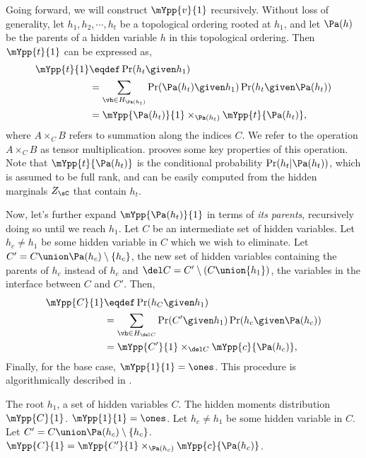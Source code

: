 Going forward, we will construct $\mYpp{v}{1}$ recursively.
Without loss of generality, let $h_1, h_2, \cdots, h_t$ be a topological
  ordering rooted at $h_1$,
and let $\Pa(h)$ be the parents of a hidden variable $h$ in
  this topological ordering.
Then $\mYpp{t}{1}$ can be expressed as,
\begin{align*}
  \mYpp{t}{1} &\eqdef \Pr( h_t \given h_1 )  \\
  &= \sum_{\vh \in H_{\Pa(h_t)}} \Pr( \Pa(h_t) \given h_1 ) \Pr( h_t \given \Pa(h_t) ) \\
  &= \mYpp{ \Pa(h_t) }{1} \times_{\Pa(h_t)} \mYpp{t}{\Pa(h_t)},
\end{align*}
where $A \times_{C} B$ refers to summation along the indices $C$. We
refer to the operation $A \times_C B$ as tensor multiplication.
 prooves some key properties of this
operation. 
Note that $\mYpp{t}{\Pa(h_t)}$ is the conditional probability $\Pr(h_t
 | \Pa(h_t))$, which is assumed to be full rank, and can be easily
 computed from the hidden marginals $Z_\sC$ that contain $h_t$. 

Now, let's further expand $\mYpp{ \Pa(h_t) }{1}$ in terms of {\em its
  parents}, recursively doing so until we reach $h_1$.
Let $C$ be an intermediate set of hidden variables. Let $h_c \neq h_1$
  be some hidden variable in $C$ which we wish to eliminate. 
Let $C' = C \union \Pa(h_c) \setminus \{h_c\}$, the new set of hidden
  variables containing the parents of $h_c$ instead of $h_c$ and $\del
  C = C' \setminus (C \union \{h_1\})$, the variables in the interface
  between $C$ and $C'$.
Then,
\begin{align*}
  \mYpp{C}{1} &\eqdef \Pr( h_C \given h_1 )  \\
  &= \sum_{\vh \in H_{\del C}} \Pr( C' \given h_1 ) \Pr( h_c \given \Pa(h_c) ) \\
  &= \mYpp{ C' }{ 1 } \times_{\del C} \mYpp{c}{\Pa(h_c)},
\end{align*}
Finally, for the base case, $\mYpp{1}{1} = \ones$.
This procedure is algorithmically described in .

\begin{algorithm}
  \caption{$\mYpp{C}{1}$}
  \label{algo:Y}
  \begin{algorithmic}
    \REQUIRE The root $h_1$, a set of hidden variables $C$.
    \ENSURE The hidden moments distribution $\mYpp{C}{1}$.
      \STATE $\mYpp{1}{1} = \ones$.
    \ELSE
      \STATE Let $h_c \neq h_1$ be some hidden variable in $C$.
      \STATE Let $C' = C \union \Pa(h_c) \setminus \{h_c\}$.
      \STATE $\mYpp{C}{1} = \mYpp{C'}{1} \times_{\Pa(h_c)} \mYpp{c}{\Pa(h_c)}$.
    \ENDIF
  \end{algorithmic}
\end{algorithm}

